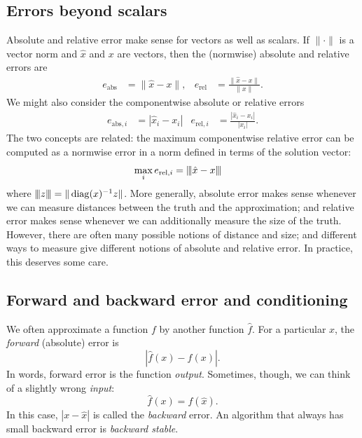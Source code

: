 \documentclass[12pt, leqno]{article}
\begin{document}
\subsection{Errors beyond scalars}

Absolute and relative error make sense for vectors as well as scalars.
If $\| \cdot \|$ is a vector
norm and $\hat{x}$ and $x$ are vectors, then the (normwise) absolute
and relative errors are
\begin{align*}
  e_{\mathrm{abs}} &= \|\hat{x}-x\|, &
  e_{\mathrm{rel}} &= \frac{\|\hat{x}-x\|}{\|x\|}.
\end{align*}
We might also consider the componentwise absolute or relative errors
\begin{align*}
  e_{\mathrm{abs},i} &= |\hat{x}_i-x_i| &
  e_{\mathrm{rel},i} &= \frac{|\hat{x}_i-x_i|}{|x_i|}.
\end{align*}
The two concepts are related: the maximum componentwise relative error
can be computed as a normwise error in a norm defined in terms of the
solution vector:
\begin{align*}
  \max_i e_{\mathrm{rel},i} &= {\left\vert\kern-0.25ex\left\vert\kern-0.25ex\left\vert \hat{x}-x \right\vert\kern-0.25ex\right\vert\kern-0.25ex\right\vert}
\end{align*}
where ${\left\vert\kern-0.25ex\left\vert\kern-0.25ex\left\vert z \right\vert\kern-0.25ex\right\vert\kern-0.25ex\right\vert} = \|\operatorname{diag}(x)^{-1} z\|$.
More generally, absolute error makes sense whenever we can measure
distances between the truth and the approximation; and relative error
makes sense whenever we can additionally measure the size of the
truth.  However, there are often many possible notions of distance
and size; and different ways to measure give different notions of
absolute and relative error.  In practice, this deserves some care.

\subsection{Forward and backward error and conditioning}

We often approximate a function $f$ by another function $\hat{f}$.
For a particular $x$, the {\em forward} (absolute) error is
\[
  |\hat{f}(x)-f(x)|.
\]
In words, forward error is the function {\em output}.  Sometimes,
though, we can think of a slightly wrong {\em input}:
\[
  \hat{f}(x) = f(\hat{x}).
\]
In this case, $|x-\hat{x}|$ is called the {\em backward} error.
An algorithm that always has small backward error is {\em backward stable}.
\end{document}
